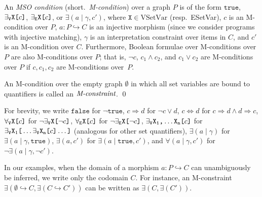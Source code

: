 \documentclass{llncs}
\newcommand{\mt}[1]{\text{\tt{#1}}}
\begin{document}
	
	
	
	\begin{definition}\rm\label{defn:M-condition}
		An \emph{MSO condition} (short.\ \emph{M-condition}) over a graph $P$ is of the form $\mathtt{true}$, $\exists_\mathtt{V} \mathtt{X}\mt{[}c\mt{]}$, $\exists_\mathtt{E} \mathtt{X}\mt{[}c\mt{]}$, or $\exists (a \mid \gamma, c')$, where $\mathtt{X}\in\text{VSetVar}$ (resp.\ ESetVar), $c$ is an M-condition over $P$, $a\!: P \hookrightarrow C$ is an injective morphism (since we consider programs with injective matching), $\gamma$ is an interpretation constraint over items in $C$, and $c'$ is an M-condition over $C$. Furthermore, Boolean formulae over M-conditions over $P$ are also M-conditions over $P$; that is, $\neg c$, $c_1 \wedge c_2$, and $c_1 \vee c_2$ are M-conditions over $P$ if $c,c_1,c_2$ are M-conditions over~$P$.
		
		An M-condition over the empty graph $\emptyset$ in which all set variables are bound to quantifiers is called an $\emph{M-constraint}$.
		\qed
	\end{definition}

		For brevity, we write $\mathtt{false}$ for $\neg\mathtt{true}$, $c\Rightarrow d$ for $\neg c \vee d$, $c \Leftrightarrow d$ for $c\Rightarrow d \wedge d \Rightarrow c$, $\forall_\mathtt{V}\mathtt{X}\mt{[}c\mt{]}$ for $\neg\exists_\mathtt{V}\mathtt{X}\mt{[}\neg c\mt{]}$, $\forall_\mathtt{E}\mathtt{X}\mt{[}c\mt{]}$ for $\neg\exists_\mathtt{E}\mathtt{X}\mt{[}\neg c\mt{]}$, $\exists_\mathtt{V}\mathtt{X_1}\mt{,}\dots\mathtt{X_n}\mt{[}c\mt{]}$ for $\exists_\mathtt{V}\mathtt{X}_1\mt{[}\dots \exists_\mathtt{V}\mathtt{X_n}\mt{[}c\mt{]}\dots\mt{]}$ (analogous for other set quantifiers), $\exists (a \mid \gamma)$ for $\exists (a \mid \gamma,\mathtt{true})$, $\exists (a,c')$ for $\exists(a\mid\mathtt{true},c')$, and $\forall(a \mid \gamma, c')$ for $\neg \exists (a \mid \gamma, \neg c')$.
		
		In our examples, when the domain of a morphism $a\colon P \hookrightarrow C$ can unambiguously be inferred, we write only the codomain $C$. For instance, an M-constraint $\exists (\emptyset \hookrightarrow C, \exists (C \hookrightarrow C'))$ can be written as $\exists (C, \exists (C'))$.
	
\end{document}

